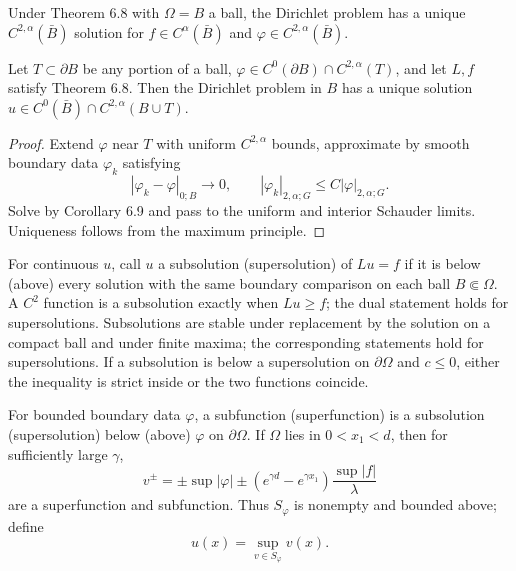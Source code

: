 \begin{corollary}
\label{gt-ch06-cor-6-9}
Under Theorem 6.8 with $\Omega=B$ a ball, the Dirichlet problem has a unique
$C^{2,\alpha}(\bar B)$ solution for $f\in C^\alpha(\bar B)$ and
$\varphi\in C^{2,\alpha}(\bar B)$.
\end{corollary}

\begin{lemma}
\label{gt-ch06-lem-6-10}
Let $T\subset\partial B$ be any portion of a ball, $\varphi\in C^0(\partial B)\cap
C^{2,\alpha}(T)$, and let $L,f$ satisfy Theorem 6.8.  Then the Dirichlet
problem in $B$ has a unique solution
$u\in C^0(\bar B)\cap C^{2,\alpha}(B\cup T)$.
\end{lemma}
\begin{proof}
\sketch Extend $\varphi$ near $T$ with uniform $C^{2,\alpha}$ bounds, approximate
by smooth boundary data $\varphi_k$ satisfying
\begin{equation}
\tag{6.43}
|\varphi_k-\varphi|_{0;B}\to0,
\qquad |\varphi_k|_{2,\alpha;G}\leq C|\varphi|_{2,\alpha;G}.
\end{equation}
Solve by Corollary 6.9 and pass to the uniform and
interior Schauder limits.  Uniqueness follows from the maximum principle.
\end{proof}

For continuous $u$, call $u$ a subsolution (supersolution) of $Lu=f$ if it is
below (above) every solution with the same boundary comparison on each ball
$B\Subset\Omega$.  A $C^2$ function is a subsolution exactly when $Lu\ge f$;
the dual statement holds for supersolutions.  Subsolutions are stable under
replacement by the solution on a compact ball and under finite maxima; the
corresponding statements hold for supersolutions.  If a subsolution is below a
supersolution on $\partial\Omega$ and $c\le0$, either the inequality is strict
inside or the two functions coincide.

For bounded boundary data $\varphi$, a subfunction (superfunction) is a
subsolution (supersolution) below (above) $\varphi$ on $\partial\Omega$.  If
$\Omega$ lies in $0<x_1<d$, then for sufficiently large $\gamma$,
\begin{equation}
\tag{6.44}
v^\pm=\pm\sup|\varphi|
\pm(e^{\gamma d}-e^{\gamma x_1})\frac{\sup|f|}{\lambda}
\end{equation}
are a superfunction and subfunction. Thus $S_\varphi$ is nonempty and bounded
above; define
\[
u(x)=\sup_{v\in S_\varphi}v(x).
\]

